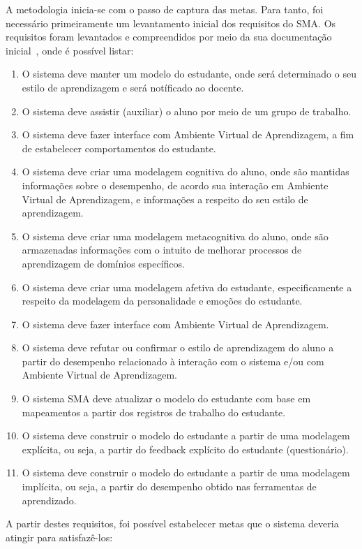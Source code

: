 A metodologia inicia-se com o passo de captura das metas. Para tanto, foi necessário primeiramente um levantamento inicial dos requisitos do SMA. Os requisitos foram levantados e compreendidos por meio da sua documentação inicial~\cite{editalFrank}, onde é possível listar:

\begin{enumerate}
	\item O sistema deve manter um modelo do estudante, onde será determinado o seu estilo de aprendizagem e será notíficado ao docente.
	\item O sistema deve assistir (auxiliar) o aluno por meio de um grupo de trabalho.
	\item O sistema deve fazer interface com Ambiente Virtual de Aprendizagem, a fim de estabelecer comportamentos do estudante.
	\item O sistema deve criar uma modelagem cognitiva do aluno, onde são mantidas informações sobre o desempenho, de acordo sua interação em Ambiente Virtual de Aprendizagem, e informações a respeito do seu estilo de aprendizagem.
	\item O sistema deve criar uma modelagem metacognitiva do aluno, onde são armazenadas informações com o intuito de melhorar processos de aprendizagem de domínios específicos.
	\item O sistema deve criar uma modelagem afetiva do estudante, especificamente a respeito da modelagem da personalidade e emoções do estudante.
	\item O sistema deve fazer interface com Ambiente Virtual de Aprendizagem.
	\item O sistema deve refutar ou confirmar o estilo de aprendizagem do aluno a partir do desempenho relacionado à interação com o sistema e/ou com Ambiente Virtual de Aprendizagem.
	\item O sistema SMA deve atualizar o modelo do estudante com base em mapeamentos a partir dos registros de trabalho do estudante.
	\item O sistema deve construir o modelo do estudante a partir de uma modelagem explícita, ou seja, a partir do feedback explícito do estudante (questionário).
	\item O sistema deve construir o modelo do estudante a partir de uma modelagem implícita, ou seja, a partir do desempenho obtido nas ferramentas de aprendizado.
\end{enumerate}

A partir destes requisitos, foi possível estabelecer metas que o sistema deveria atingir para satisfazê-los:


